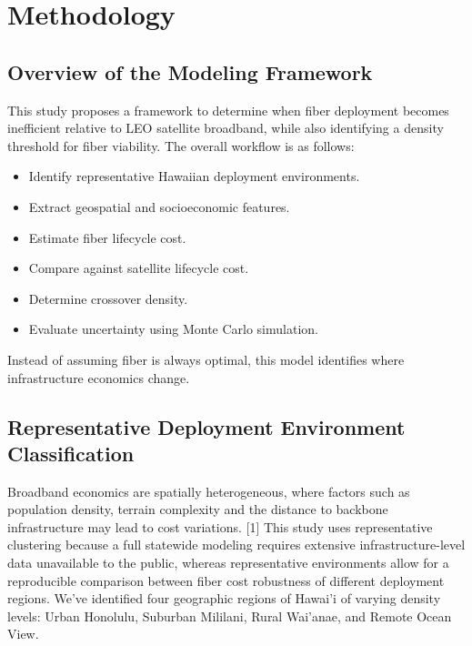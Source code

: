\documentclass[conference]{IEEEtran}
\begin{document}
\section{Methodology}

\subsection{Overview of the Modeling Framework}
This study proposes a framework to determine when fiber deployment becomes inefficient relative to LEO satellite broadband, while also identifying a density threshold for fiber viability.
The overall workflow is as follows:
\begin{itemize}
\item Identify representative Hawaiian deployment environments.
\item Extract geospatial and socioeconomic features.
\item Estimate fiber lifecycle cost.
\item Compare against satellite lifecycle cost.
\item Determine crossover density.
\item Evaluate uncertainty using Monte Carlo simulation.
\end{itemize}

Instead of assuming fiber is always optimal, this model identifies where infrastructure economics change.

\subsection{Representative Deployment Environment Classification}
Broadband economics are spatially heterogeneous, where factors such as population density, terrain complexity and the distance to backbone infrastructure may lead to cost variations. [1]
This study uses representative clustering because a full statewide modeling requires extensive infrastructure-level data unavailable to the public, whereas representative environments allow for a reproducible comparison between fiber cost robustness of different deployment regions.
We’ve identified four geographic regions of Hawai'i of varying density levels: Urban Honolulu, Suburban Mililani, Rural Wai'anae, and Remote Ocean View. 
\end{document}

